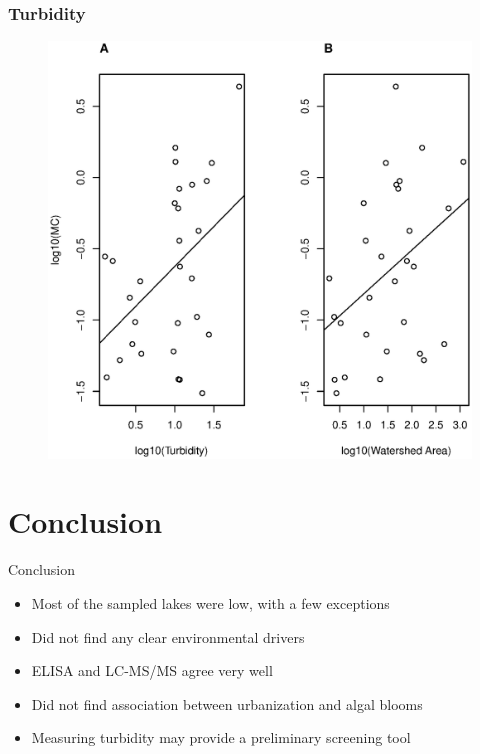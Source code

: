 	\begin{frame} 
		\frametitle{Turbidity} 
		\begin{figure} 
			\includegraphics[width=\textwidth, height=0.8\textheight]{../figures/plot2.eps}
		\end{figure}
	\end{frame}

\section{Conclusion}
\begin{frame}{Conclusion}
	\begin{itemize}
		\item Most of the sampled lakes were low, with a few exceptions 
		\item Did not find any clear environmental drivers 
		\item ELISA and LC-MS/MS agree very well 
		\item Did not find association between urbanization and algal blooms 
		\item Measuring turbidity may provide a preliminary screening tool
	\end{itemize}

	
\end{frame}




